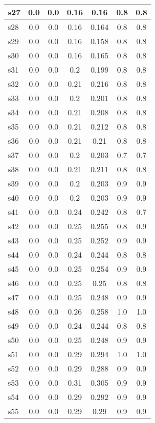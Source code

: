 \documentclass{article}
\begin{document}
\begin{tabular}{|l|c|c|c|c|c|c|}
\hline
s27 &0.0 & 0.0 & 0.16 & 0.16 & 0.8 & 0.8\\
\hline
s28 &0.0 & 0.0 & 0.16 & 0.164 & 0.8 & 0.8\\
\hline
s29 &0.0 & 0.0 & 0.16 & 0.158 & 0.8 & 0.8\\
\hline
s30 &0.0 & 0.0 & 0.16 & 0.165 & 0.8 & 0.8\\
\hline
s31 &0.0 & 0.0 & 0.2 & 0.199 & 0.8 & 0.8\\
\hline
s32 &0.0 & 0.0 & 0.21 & 0.216 & 0.8 & 0.8\\
\hline
s33 &0.0 & 0.0 & 0.2 & 0.201 & 0.8 & 0.8\\
\hline
s34 &0.0 & 0.0 & 0.21 & 0.208 & 0.8 & 0.8\\
\hline
s35 &0.0 & 0.0 & 0.21 & 0.212 & 0.8 & 0.8\\
\hline
s36 &0.0 & 0.0 & 0.21 & 0.21 & 0.8 & 0.8\\
\hline
s37 &0.0 & 0.0 & 0.2 & 0.203 & 0.7 & 0.7\\
\hline
s38 &0.0 & 0.0 & 0.21 & 0.211 & 0.8 & 0.8\\
\hline
s39 &0.0 & 0.0 & 0.2 & 0.203 & 0.9 & 0.9\\
\hline
s40 &0.0 & 0.0 & 0.2 & 0.203 & 0.9 & 0.9\\
\hline
s41 &0.0 & 0.0 & 0.24 & 0.242 & 0.8 & 0.7\\
\hline
s42 &0.0 & 0.0 & 0.25 & 0.255 & 0.8 & 0.9\\
\hline
s43 &0.0 & 0.0 & 0.25 & 0.252 & 0.9 & 0.9\\
\hline
s44 &0.0 & 0.0 & 0.24 & 0.244 & 0.8 & 0.8\\
\hline
s45 &0.0 & 0.0 & 0.25 & 0.254 & 0.9 & 0.9\\
\hline
s46 &0.0 & 0.0 & 0.25 & 0.25 & 0.8 & 0.8\\
\hline
s47 &0.0 & 0.0 & 0.25 & 0.248 & 0.9 & 0.9\\
\hline
s48 &0.0 & 0.0 & 0.26 & 0.258 & 1.0 & 1.0\\
\hline
s49 &0.0 & 0.0 & 0.24 & 0.244 & 0.8 & 0.8\\
\hline
s50 &0.0 & 0.0 & 0.25 & 0.248 & 0.9 & 0.9\\
\hline
s51 &0.0 & 0.0 & 0.29 & 0.294 & 1.0 & 1.0\\
\hline
s52 &0.0 & 0.0 & 0.29 & 0.288 & 0.9 & 0.9\\
\hline
s53 &0.0 & 0.0 & 0.31 & 0.305 & 0.9 & 0.9\\
\hline
s54 &0.0 & 0.0 & 0.29 & 0.292 & 0.9 & 0.9\\
\hline
s55 &0.0 & 0.0 & 0.29 & 0.29 & 0.9 & 0.9\\

\end{tabular}
\end{document}
